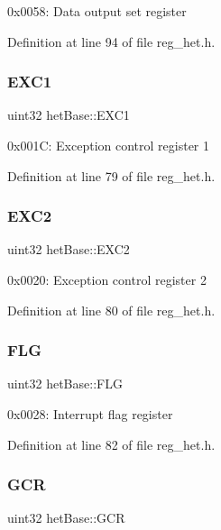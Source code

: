 0x0058\+: Data output set register 

Definition at line 94 of file reg\+\_\+het.\+h.

\mbox{\label{structhetBase_ae10fa53c3fffe6c6c1603c7de120a538}} 
\subsubsection{\texorpdfstring{E\+X\+C1}{EXC1}}
{\footnotesize\ttfamily uint32 het\+Base\+::\+E\+X\+C1}

0x001C\+: Exception control register 1 

Definition at line 79 of file reg\+\_\+het.\+h.

\mbox{\label{structhetBase_a6d39e0c9792e065662f0b0d7e3f3a182}} 
\subsubsection{\texorpdfstring{E\+X\+C2}{EXC2}}
{\footnotesize\ttfamily uint32 het\+Base\+::\+E\+X\+C2}

0x0020\+: Exception control register 2 

Definition at line 80 of file reg\+\_\+het.\+h.

\mbox{\label{structhetBase_ad2e3864f704c917203f762fc5c44dbcc}} 
\subsubsection{\texorpdfstring{F\+LG}{FLG}}
{\footnotesize\ttfamily uint32 het\+Base\+::\+F\+LG}

0x0028\+: Interrupt flag register 

Definition at line 82 of file reg\+\_\+het.\+h.

\mbox{\label{structhetBase_a9e649c2a8b62a3d6341e6bc7003e128f}} 
\subsubsection{\texorpdfstring{G\+CR}{GCR}}
{\footnotesize\ttfamily uint32 het\+Base\+::\+G\+CR}

